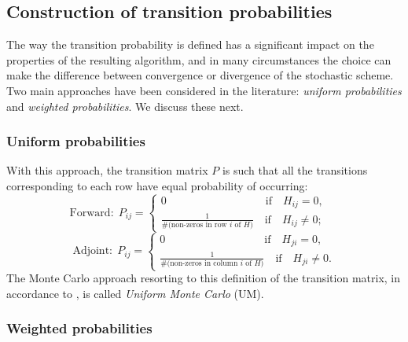 \documentclass[final,leqno,onefignum,onetabnum]{siamltex1213}
\begin{document}
\subsection{Construction of transition probabilities}

The way the transition probability is defined has a significant impact
on the properties of the resulting algorithm, and in many circumstances the
choice can make the difference between convergence or divergence of the stochastic
scheme.  Two main approaches have been considered in the literature:
\textit{uniform probabilities} and \textit{weighted probabilities}.
We discuss these next.

\subsubsection{Uniform probabilities}

With this approach, the transition matrix $P$ is such that all the
transitions corresponding to each row have equal probability of occurring:
\[
\text{Forward}:\;P_{ij}=
\begin{cases}
0 \quad \quad \quad \qquad \qquad \qquad \text{if}\quad H_{ij}=0, \\
\frac{1}{\#(\text{non-zeros in row $i$ of $H$)}} \quad \text{if} \quad H_{ij}\ne 0;
\end{cases}\quad
\]
\[
\text{Adjoint}:\;P_{ij}=
\begin{cases}
0 \quad \quad \quad \qquad \qquad \qquad \text{if}\quad H_{ji}=0, \\
\frac{1}{\#(\text{non-zeros in column $i$ of $H$)}} \quad \text{if} \quad H_{ji}\ne 0.
\end{cases}
\]
The Monte Carlo approach resorting to this definition of the transition matrix,
in accordance to \cite{AADBTW2005}, is called \textit{Uniform Monte Carlo} (UM).

\subsubsection{Weighted probabilities}
\end{document}
